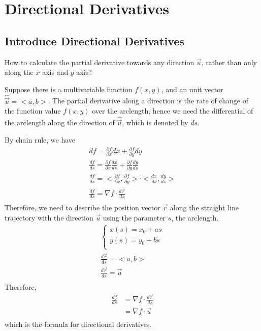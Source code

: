 \documentclass{article}
\begin{document}
\section{Directional Derivatives}

\subsection{Introduce Directional Derivatives}

How to calculate the partial derivative towards any direction $\vec{u}$, rather 
than only along the $x$ axis and $y$ axis?

Suppose there is a multivariable function $f(x, y)$, and an unit vector 
$\hat{\vec{u}} = <a, b>$. The partial derivative along a direction is the rate 
of change of the function value $f(x, y)$ over the arclength, hence we need the 
differential of the arclength along the direction of $\hat{\vec{u}}$, which is 
denoted by $ds$. 

By chain rule, we have
\begin{gather*}
  df = \frac{\partial f}{\partial x}dx + \frac{\partial f}{\partial y}dy \\
  \frac{df}{ds} = \frac{\partial f}{\partial x}\frac{dx}{ds} + \frac{\partial f}{\partial y}\frac{dy}{ds} \\
  \frac{df}{ds} = <\frac{\partial f}{\partial x}, \frac{\partial f}{\partial y}> \cdot <\frac{dx}{ds}, \frac{dy}{ds}> \\
  \frac{df}{ds} = \nabla f \cdot \frac{d\vec{r}}{ds} \\
\end{gather*}
Therefore, we need to describe the position vector $\vec{r}$ along the straight 
line trajectory with the direction $\vec{u}$ using the parameter $s$, the 
arclength.
\begin{gather*}
  \begin{cases}
    x(s) = x_0 + as \\
    y(s) = y_0 + bs \\
  \end{cases} \\
  \frac{d\vec{r}}{ds} = <a, b> \\
  \frac{d\vec{r}}{ds} = \vec{u} \\
\end{gather*}
Therefore,
\begin{equation*}
  \begin{split}
    \frac{df}{ds} &= \nabla f \cdot \frac{d\vec{r}}{ds} \\
                  &= \nabla f \cdot \vec{u} \\
  \end{split}
\end{equation*}
which is the formula for directional derivatives.
\end{document}
